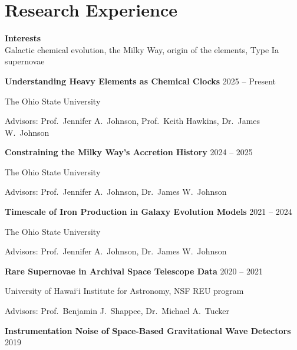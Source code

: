 \section*{Research Experience}

\noindent
{\bf Interests} \\
Galactic chemical evolution, the Milky Way, origin of the elements, Type Ia supernovae

\vspace{12pt}
\noindent
{\bf Understanding Heavy Elements as Chemical Clocks}
\hfill 2025 -- Present

The Ohio State University

Advisors: Prof.\ Jennifer A.\ Johnson, Prof.\ Keith Hawkins, Dr.\ James W.\ Johnson
\vspace{12pt}

\noindent
{\bf Constraining the Milky Way's Accretion History}
\hfill 2024 -- 2025

The Ohio State University

Advisors: Prof.\ Jennifer A.\ Johnson, Dr.\ James W.\ Johnson
\vspace{12pt}

\noindent
{\bf Timescale of Iron Production in Galaxy Evolution Models}
\hfill 2021 -- 2024

The Ohio State University

Advisors: Prof.\ Jennifer A.\ Johnson, Dr.\ James W.\ Johnson
\vspace{12pt}

\noindent
{\bf Rare Supernovae in Archival Space Telescope Data}
\hfill 2020 -- 2021

University of Hawai`i Institute for Astronomy, NSF REU program

Advisors: Prof.\ Benjamin J.\ Shappee, Dr.\ Michael A.\ Tucker
\vspace{12pt}

\noindent
{\bf Instrumentation Noise of Space-Based Gravitational Wave Detectors}
\hfill 2019

